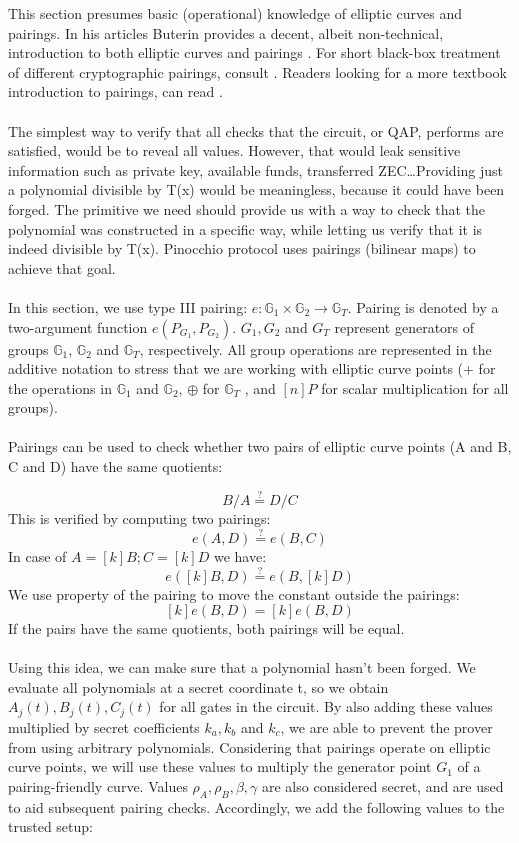 This section presumes basic (operational) knowledge of elliptic curves and pairings. In his articles Buterin provides a decent, albeit non-technical, introduction to both elliptic curves and pairings \cite{buterin1, buterin2, buterin3}. For short black-box treatment of different cryptographic pairings, consult \cite{galbraith2008pairings}. Readers looking for a more textbook introduction to pairings, can read \cite{costello2012pairings}.\\
\\
The simplest way to verify that all checks that the circuit, or QAP, performs are satisfied, would be to reveal all values. However, that would leak sensitive information such as private key, available funds, transferred ZEC\dots Providing just a polynomial divisible by T(x) would be meaningless, because it could have been forged. The primitive we need should provide us with a way to check that the polynomial was constructed in a specific way, while letting us verify that it is indeed divisible by T(x). Pinocchio protocol \cite{parno2013pinocchio} uses  pairings (bilinear maps) to achieve that goal.\\
\\
In this section, we use type III pairing: $e: \mathbb{G}_1 \times \mathbb{G}_2 \to \mathbb{G}_T$. Pairing is denoted by a two-argument function $e(P_{G_1}, P_{G_2})$. $G_1, G_2$ and $G_T$ represent generators of groups $\mathbb{G}_1$, $\mathbb{G}_2$ and $\mathbb{G}_T$, respectively. All group operations are represented in the additive notation to stress that we are working with elliptic curve points (+ for the operations in $\mathbb{G}_1$ and $\mathbb{G}_2$, $\oplus$ for $\mathbb{G}_T$ , and $[n]P$ for scalar multiplication for all groups).\\
\\
Pairings can be used to check whether two pairs of elliptic curve points (A and B, C and D) have the same quotients:

$$ B / A \stackrel{?}{=} D / C $$
This is verified by computing two pairings:
$$ e(A, D) \stackrel{?}{=} e(B, C) $$
In case of $A = [k]B; C = [k]D$ we have:
$$ e([k]B, D) \stackrel{?}{=} e(B, [k]D)$$
We use property of the pairing to move the constant outside the pairings:
$$ [k]e(B, D) = [k]e(B, D) $$
If the pairs have the same quotients, both pairings will be equal.\\
\\
Using this idea, we can make sure that a polynomial hasn't been forged. We evaluate all polynomials at a secret coordinate t, so we obtain $A_j(t), B_j(t), C_j(t)$ for all gates in the circuit. By also adding these values multiplied by secret coefficients $k_a, k_b$ and $k_c$, we are able to prevent the prover from using arbitrary polynomials. Considering that pairings operate on elliptic curve points, we will use these values to multiply the generator point $G_1$ of a pairing-friendly curve. Values $\rho_A, \rho_B, \beta, \gamma$ are also considered secret, and are used to aid subsequent pairing checks. Accordingly, we add the following values to the trusted setup:

